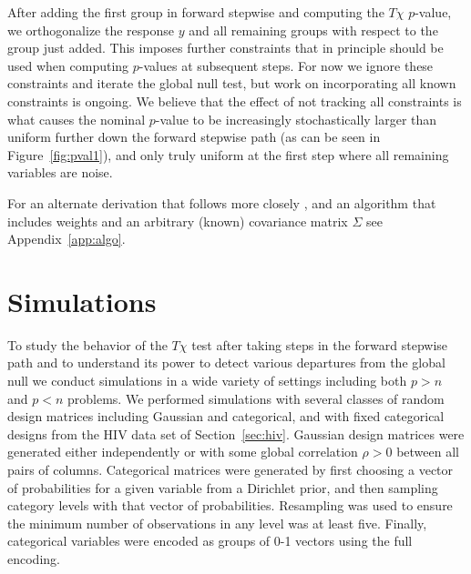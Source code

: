 \documentclass{imsart}
\begin{document}
After adding the first group in forward stepwise and computing the $T\chi$ $p$-value, we orthogonalize the response $y$ and all remaining groups with respect to the group just added. This imposes further constraints that in principle should be used when computing $p$-values at subsequent steps. For now we ignore these constraints and iterate the global null test, but work on incorporating all known constraints is ongoing. We believe that the effect of not tracking all constraints is what causes the nominal $p$-value to be increasingly stochastically larger than uniform further down the forward stepwise path (as can be seen in Figure~\ref{fig:pval1}), and only truly uniform at the first step where all remaining variables are noise.

For an alternate derivation that follows more closely \cite{tests:adaptive}, and an algorithm that includes weights and an arbitrary (known) covariance matrix $\Sigma$ see Appendix~\ref{app:algo}.

\section{Simulations}
\label{sec:simulations}

To study the behavior of the $T\chi$ test after taking steps in the forward stepwise path and to understand its power to detect various departures from the global null we conduct simulations in a wide variety of settings including both $p > n$ and $p < n$ problems.
We performed simulations with several classes of random design matrices
including Gaussian and categorical, and with fixed categorical designs
from the HIV data set of Section~\ref{sec:hiv}. Gaussian
design matrices were generated either independently or with some global
correlation $\rho > 0$ between all pairs of columns. Categorical matrices
were generated by first choosing a vector of probabilities for a given
variable from a Dirichlet prior, and then sampling category levels with
that vector of probabilities. Resampling was used to ensure the minimum
number of observations in any level was at least five. Finally, categorical
variables were encoded as groups of 0-1 vectors using the full encoding.
\end{document}
